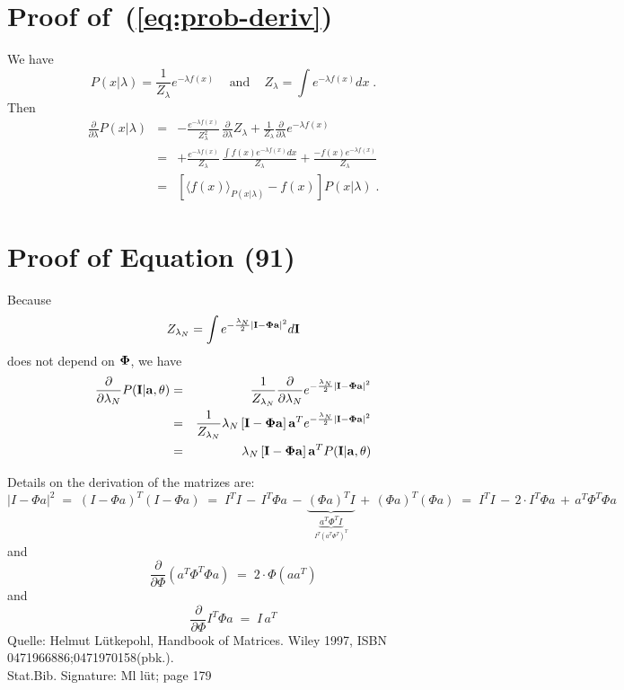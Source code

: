 \documentclass[12pt]{article}
\newcommand{\params}{\theta}
\newcommand{\ba}{{\bf a}}
\newcommand{\bI}{{\bf I}}
\newcommand{\bPhi}{{\bf \Phi}}
\newcommand{\pd}[1]{\frac{\partial}{\partial #1}}
\begin{document}
\section{Proof of~(\ref{eq:prob-deriv})}
\label{app:prob-deriv}

We have
\begin{equation}
P(x|\lambda)=\frac{1}{Z_\lambda} e^{-\lambda f(x)} \;\;\;\mbox{ and }\;\;\; Z_\lambda=\int e^{-\lambda f(x)} dx\; .
\end{equation}
Then
\begin{eqnarray}
\pd{\lambda} P(x|\lambda)
 & = & -\frac{e^{-\lambda f(x)}}{Z_\lambda^2} \, \pd{\lambda} Z_\lambda + \frac{1}{Z_\lambda} \pd{\lambda} e^{-\lambda f(x)} \\
 & = & +\frac{e^{-\lambda f(x)}}{Z_\lambda} \, \frac{\int f(x) e^{-\lambda f(x)} dx}{Z_\lambda} + \frac{-f(x) e^{-\lambda f(x)}}{Z_\lambda} \\
 & = &  \left[ \langle f(x) \rangle_{P(x|\lambda)} - f(x) \right] P(x|\lambda)\; .
\end{eqnarray}


{\small

\clearpage
\section{Proof of Equation (91)}

Because
\begin{equation}
Z_{\lambda_N} = \int e^{-\frac{\lambda_N}{2}|\bI-\bPhi\ba|^2} d\bI
\end{equation}
does not depend on $\bPhi$, we have
\begin{eqnarray}
\pd{\lambda_N} P(\bI|\ba,\params) & = & \frac{1}{Z_{\lambda_N}} \pd{\lambda_N} e^{-\frac{\lambda_N}{2}|\bI-\bPhi\ba|^2} \\
 & = & \frac{1}{Z_{\lambda_N}} \lambda_N \left[\bI-\bPhi\ba \right]\ba^T  e^{-\frac{\lambda_N}{2}|\bI-\bPhi\ba|^2} \\
 & = & \lambda_N \left[\bI-\bPhi\ba \right]\ba^T P(\bI|\ba,\params)
\end{eqnarray}

Details on the derivation of the matrizes are:
\[
|I-\Phi a|^2 \; = \; (I-\Phi a)^T (I - \Phi a)
             \; = \; I^T I \, - \, I^T \Phi a \, - \, \underbrace{(\Phi a)^T I}_{\underbrace{a^T \Phi^T I}_{I^T (a^T \Phi^T)^T}} \, + \, (\Phi a)^T (\Phi a)
             \; = \; I^T I \, - \, 2 \cdot I^T \Phi a \, + \, a^T \Phi^T \Phi a
\]
and
\[
\frac{\partial}{\partial \Phi} (a^T \Phi^T \Phi a) \; = \; 2 \cdot \Phi (a a^T)
\]
and
\[
\frac{\partial}{\partial \Phi} I^T \Phi a \; = \; I \, a^T
\]
{\tiny Quelle: Helmut L{\"u}tkepohl, Handbook of Matrices. Wiley 1997, ISBN 0471966886;0471970158(pbk.).\\
       Stat.Bib. Signature: Ml l{\"u}t; page 179}

}
\end{document}

